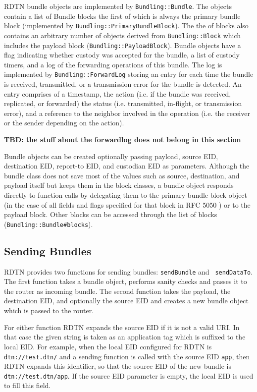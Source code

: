 \documentclass{article}
\begin{document}
RDTN bundle objects are implemented by {\tt Bundling::Bundle}. The objects
contain a list of Bundle blocks the first of which is always the primary bundle
block (implemented by {\tt Bundling::PrimaryBundleBlock}). The the of blocks
also contains an arbitrary number of objects derived from {\tt Bundling::Block}
which includes the payload block ({\tt Bundling::PayloadBlock}). Bundle objects
have a flag indicating whether custody was accepted for the bundle, a list of
custody timers, and a log of the forwarding operations of this bundle. The
log is implemented by {\tt Bundling::ForwardLog} storing an entry for
each time the bundle is received, transmitted, or a transmission error for the
bundle is detected. An entry comprises of a timestamp, the action (i.e. if the
bundle was received, replicated, or forwarded) the status (i.e. transmitted,
in-flight, or transmission error), and a reference to
the neighbor involved in the operation (i.e. the receiver or the sender
depending on the action).

{\bf TBD: the stuff about the forwardlog does not belong in this section}

Bundle objects can be created optionally passing payload, source EID,
destination EID, report-to EID, and custodian EID as parameters. Although the
bundle class does not save most of the values such as source, destination, and
payload itself but keeps them in the block classes, a bundle object responds
directly to function calls by delegating them to the primary bundle block object
(in the case of all fields and flags specified for that block in RFC 5050
\cite{bundle-spec}) or to the payload block. Other blocks can be accessed
through the list of blocks ({\tt Bundling::Bundle\#blocks}).

\subsection{Sending Bundles}\label{sec.sending}

RDTN provides two functions for sending bundles: {\tt sendBundle} and {\tt
sendDataTo}. The first function takes a bundle object, performs sanity checks
and passes it to the router as incoming bundle. The second function takes the
payload, the destination EID, and optionally the source EID and creates a new
bundle object which is passed to the router.

For either function RDTN expands the source EID if it is not a valid URI. In
that case the given string is taken as an application tag which is suffixed to
the local EID. For example, when the local EID configured for RDTN is {\tt
dtn://test.dtn/} and a sending function is called with the source EID {\tt app},
then RDTN expands this identifier, so that the source EID of the new bundle is
{\tt dtn://test.dtn/app}. If the source EID parameter is empty, the local EID is
used to fill this field.
\end{document}
